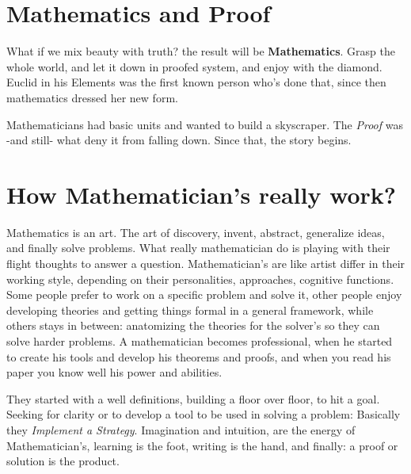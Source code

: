 \section{Mathematics and Proof}
What if we mix beauty with truth? the result will be {\bf Mathematics}. Grasp the whole world, and let it down in proofed system, and enjoy with the diamond. Euclid in his Elements\cite{euclid1956elements} was the first known person who's done that, since then mathematics dressed her new form.

Mathematicians had basic units and wanted to build a skyscraper. The {\it Proof} was -and still- what deny it from falling down. Since that, the story begins.

\section{How Mathematician's really work?}\label{intro.work}
Mathematics is an art. The art of discovery, invent, abstract, generalize ideas, and finally solve problems. What really mathematician do is playing with their flight thoughts to answer a question. Mathematician's are like artist  differ in their working style, depending on their personalities, approaches, cognitive functions. Some people prefer to work on a specific problem and solve it, other people enjoy developing theories and getting things formal in a general framework, while others stays in between: anatomizing the theories for the solver's so they can solve harder problems. A mathematician becomes professional, when he started to create his tools and develop his theorems and proofs, and when you read his paper you know well his power and abilities.

They started with a well definitions, building a floor over floor, to hit a goal. Seeking for clarity or to develop a tool to be used in solving a problem: Basically they {\it Implement a Strategy}. Imagination and intuition, are the energy of Mathematician's, learning is the foot, writing is the hand, and finally: a proof or solution is the product.
